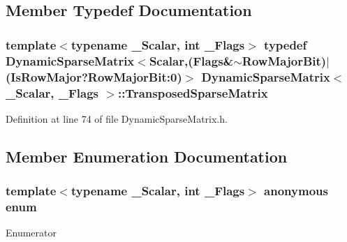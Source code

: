 \subsection{Member Typedef Documentation}
\hypertarget{class_dynamic_sparse_matrix_a17501e94beed85eb9cad33fa5520d398}{
\subsubsection[{Transposed\-Sparse\-Matrix}]{\setlength{\rightskip}{0pt plus 5cm}template$<$typename \-\_\-\-Scalar, int \-\_\-\-Flags$>$ typedef {\bf Dynamic\-Sparse\-Matrix}$<${\bf Scalar},({\bf Flags}\&$\sim${\bf Row\-Major\-Bit})$|$({\bf Is\-Row\-Major}?Row\-Major\-Bit\-:0)$>$ {\bf Dynamic\-Sparse\-Matrix}$<$ \-\_\-\-Scalar, \-\_\-\-Flags $>$\-::{\bf Transposed\-Sparse\-Matrix}\hspace{0.3cm}{\ttfamily [protected]}}}\label{class_dynamic_sparse_matrix_a17501e94beed85eb9cad33fa5520d398}


Definition at line 74 of file Dynamic\-Sparse\-Matrix.\-h.



\subsection{Member Enumeration Documentation}
\hypertarget{class_dynamic_sparse_matrix_a47215f6c238780cd57e81e75ab6d4263}{\subsubsection[{anonymous enum}]{\setlength{\rightskip}{0pt plus 5cm}template$<$typename \-\_\-\-Scalar, int \-\_\-\-Flags$>$ anonymous enum\hspace{0.3cm}{\ttfamily [protected]}}}\label{class_dynamic_sparse_matrix_a47215f6c238780cd57e81e75ab6d4263}
\begin{Desc}
\item[Enumerator]\par
\begin{description}
\item[{\em 
\hypertarget{class_dynamic_sparse_matrix_a47215f6c238780cd57e81e75ab6d4263af7eb92e91c48fdf4583d99c7c3bbd3db}{Is\-Row\-Major}\label{class_dynamic_sparse_matrix_a47215f6c238780cd57e81e75ab6d4263af7eb92e91c48fdf4583d99c7c3bbd3db}
}]\end{description}
\end{Desc}


